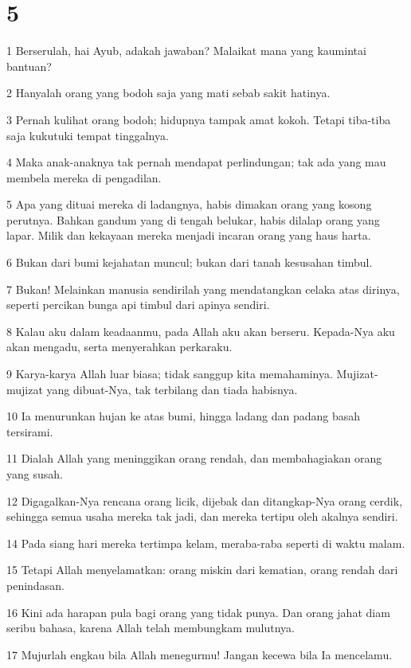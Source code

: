 \chapter{5}

\par 1 Berserulah, hai Ayub, adakah jawaban? Malaikat mana yang kaumintai bantuan?
\par 2 Hanyalah orang yang bodoh saja yang mati sebab sakit hatinya.
\par 3 Pernah kulihat orang bodoh; hidupnya tampak amat kokoh. Tetapi tiba-tiba saja kukutuki tempat tinggalnya.
\par 4 Maka anak-anaknya tak pernah mendapat perlindungan; tak ada yang mau membela mereka di pengadilan.
\par 5 Apa yang dituai mereka di ladangnya, habis dimakan orang yang kosong perutnya. Bahkan gandum yang di tengah belukar, habis dilalap orang yang lapar. Milik dan kekayaan mereka menjadi incaran orang yang haus harta.
\par 6 Bukan dari bumi kejahatan muncul; bukan dari tanah kesusahan timbul.
\par 7 Bukan! Melainkan manusia sendirilah yang mendatangkan celaka atas dirinya, seperti percikan bunga api timbul dari apinya sendiri.
\par 8 Kalau aku dalam keadaanmu, pada Allah aku akan berseru. Kepada-Nya aku akan mengadu, serta menyerahkan perkaraku.
\par 9 Karya-karya Allah luar biasa; tidak sanggup kita memahaminya. Mujizat-mujizat yang dibuat-Nya, tak terbilang dan tiada habisnya.
\par 10 Ia menurunkan hujan ke atas bumi, hingga ladang dan padang basah tersirami.
\par 11 Dialah Allah yang meninggikan orang rendah, dan membahagiakan orang yang susah.
\par 12 Digagalkan-Nya rencana orang licik, dijebak dan ditangkap-Nya orang cerdik, sehingga semua usaha mereka tak jadi, dan mereka tertipu oleh akalnya sendiri.
\par 14 Pada siang hari mereka tertimpa kelam, meraba-raba seperti di waktu malam.
\par 15 Tetapi Allah menyelamatkan: orang miskin dari kematian, orang rendah dari penindasan.
\par 16 Kini ada harapan pula bagi orang yang tidak punya. Dan orang jahat diam seribu bahasa, karena Allah telah membungkam mulutnya.
\par 17 Mujurlah engkau bila Allah menegurmu! Jangan kecewa bila Ia mencelamu.
